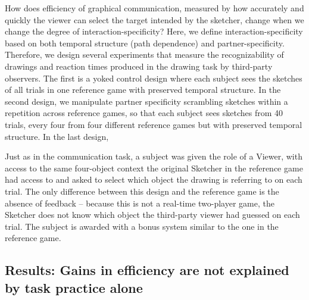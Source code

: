 \documentclass[10pt,letterpaper]{article}
\begin{document}
How does efficiency of graphical communication, measured by how accurately and quickly the viewer can select the target intended by the sketcher, change when we change the degree of interaction-specificity? 
Here, we define interaction-specificity based on both temporal structure (path dependence) and partner-specificity. 
Therefore, we design several experiments that measure the recognizability of drawings and reaction times produced in the drawing task by third-party observers. 
The first is a yoked control design where each subject sees the sketches of all trials in one reference game with preserved temporal structure. 
In the second design, we manipulate partner specificity scrambling sketches within a repetition across reference games, so that each subject sees sketches from 40 trials, every four from four different reference games but with preserved temporal structure. In the last design,

Just as in the communication task, a subject was given the role of a Viewer, with access to the same four-object context the original Sketcher in the reference game had access to and asked to select which object the drawing is referring to on each trial. 
The only difference between this design and the reference game is the absence of feedback -- because this is not a real-time two-player game, the Sketcher does not know which object the third-party viewer had guessed on each trial. 
The subject is awarded with a bonus system similar to the one in the reference game.

\subsection{Results: Gains in efficiency are not explained by task practice alone}


\end{document}
